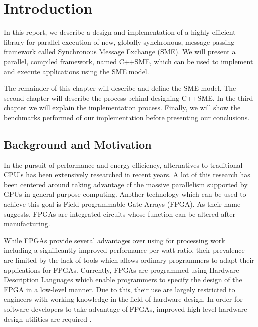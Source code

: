 \chapter{Introduction}

In this report, we describe a design and implementation of a highly
efficient library for parallel execution of new, globally synchronous,
message passing framework called Synchronous Message Exchange
(SME). We will present a parallel, compiled framework, named
C++SME, which can be used to implement and execute applications
using the SME model.

The remainder of this chapter will describe and define the SME
model. The second chapter will describe the process behind designing
C++SME. In the third chapter we will explain the implementation
process. Finally, we will show the benchmarks performed of our
implementation before presenting our conclusions.


\section{Background and Motivation}
In the pursuit of performance and energy efficiency, alternatives to
traditional CPU's has been extensively researched in recent years. A
lot of this research has been centered around taking advantage of the
massive parallelism supported by GPUs in general purpose
computing. Another technology which can be used to achieve this goal
is Field-programmable Gate Arrays (FPGA). As their name suggests,
FPGAs are integrated circuits whose function can be altered after
manufacturing.

While FPGAs provide several advantages over using for processing work
including a significantly improved performance-per-watt ratio, their
prevalence are limited by the lack of tools which allows ordinary
programmers to adapt their applications for FPGAs. Currently,
FPGAs are programmed using Hardware Description Languages which enable
programmers to specify the design of the FPGA in a low-level
manner. Due to this, their use are largely restricted to engineers
with working knowledge in the field of hardware design. In order for
software developers to take advantage of FPGAs, improved high-level
hardware design utilities are required \cite{bacon2013fpga}.

